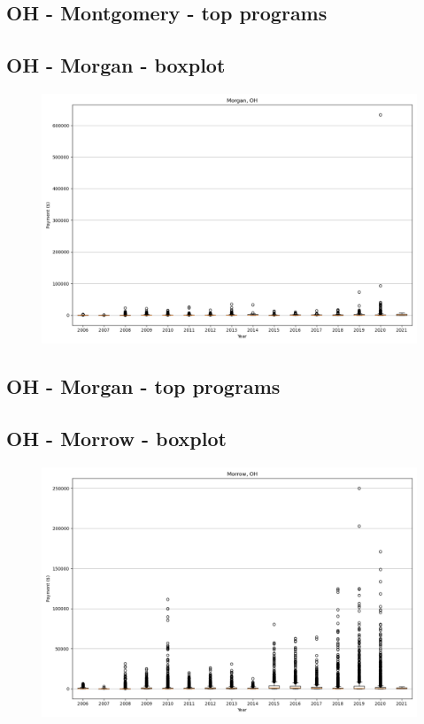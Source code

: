 \subsection*{OH - Montgomery - top programs}

\newpage
\subsection*{OH - Morgan - boxplot}
\begin{figure}[h]
\centering
\includegraphics[width=7in]{../output/boxplots/counties/Morgan-OH_boxplot.png}
\end{figure}


\subsection*{OH - Morgan - top programs}

\newpage
\subsection*{OH - Morrow - boxplot}
\begin{figure}[h]
\centering
\includegraphics[width=7in]{../output/boxplots/counties/Morrow-OH_boxplot.png}
\end{figure}


